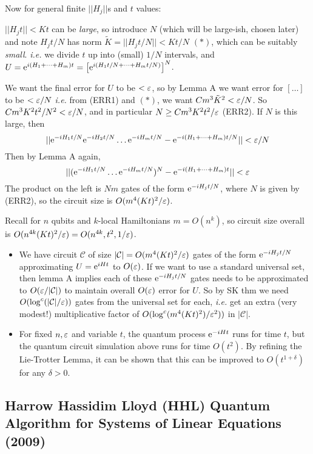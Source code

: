 \documentclass[]{article}
\renewcommand{\it}[1]{\textit{#1}}
\begin{document}
Now for general finite $||H_j||$s and $t$ values:

$||H_jt||<Kt$ can be \it{large}, so introduce $N$ (which will be large-ish, chosen later) and note $H_jt/N$ has norm $\tilde{K} = ||H_jt/N|| < Kt/N$ $(\ast)$, which can be suitably \it{small}. \it{i.e.} we divide $t$ up into (small) $1/N$ intervals, and $U = \mathrm{e}^{i(H_1+\dots +H_m)t} = \left[\mathrm{e}^{i(H_1t/N+\dots +H_mt/N)}\right]^N$.

We want the final error for $U$ to be $<\varepsilon$, so by Lemma A we want error for $[\dots]$ to be $< \varepsilon /N$ \it{i.e.} from (ERR1) and $(\ast)$, we want $Cm^3\tilde{K}^2 < \varepsilon /N$. So $Cm^3K^2t^2/N^2 < \varepsilon /N$, and in particular $N\ge Cm^3K^2t^2/\varepsilon$ (ERR2). If $N$ is this large, then $$||\mathrm{e}^{-iH_1t/N}\mathrm{e}^{-iH_2t/N}\dots\mathrm{e}^{-iH_mt/N} - \mathrm{e}^{-i(H_1+\dots+H_m)t/N}|| < \varepsilon/N$$ Then by Lemma A again, $$||(\mathrm{e}^{-iH_1t/N}\dots\mathrm{e}^{-iH_mt/N})^N - \mathrm{e}^{-i(H_1+\dots+H_m)t}|| < \varepsilon$$ The product on the left is $Nm$ gates of the form $\mathrm{e}^{-iH_jt/N}$, where $N$ is given by (ERR2), so the circuit size is $O(m^4(Kt)^2/\varepsilon)$.

Recall for $n$ qubits and $k$-local Hamiltonians $m = O(n^k)$, so circuit size overall is $O(n^{4k}(Kt)^2/\varepsilon) = O(n^{4k},t^2,1/\varepsilon)$.


\begin{itemize}
	\item We have circuit $\mathcal{C}$ of size $|\mathcal{C}| = O(m^4 (Kt)^2/\varepsilon)$ gates of the form $\mathrm{e}^{-iH_jt/N}$ approximating $U = \mathrm{e}^{iHt}$ to $O(\varepsilon)$. If we want to use a standard universal set, then lemma A implies each of these $\mathrm{e}^{-iH_jt/N}$ gates needs to be approximated to $O(\varepsilon/|\mathcal{C}|)$ to maintain overall $O(\varepsilon)$ error for $U$. So by SK thm we need $O(\log^c(|\mathcal{C}|/\varepsilon))$ gates from the universal set for each, \it{i.e.} get an extra (very modest!) multiplicative factor of $O(\log^c(m^4(Kt)^2)/\varepsilon^2))$ in $|\mathcal{C}|$.
	
	\item For fixed $n,\varepsilon$ and variable $t$, the quantum process $\mathrm{e}^{-iHt}$ runs for time $t$, but the quantum circuit simulation above runs for time $O(t^2)$. By refining the Lie-Trotter Lemma, it can be shown that this can be improved to $O(t^{1+\delta})$ for any $\delta > 0$.
\end{itemize}


\subsection*{Harrow Hassidim Lloyd (HHL) Quantum Algorithm for Systems of Linear Equations (2009)}
\end{document}
